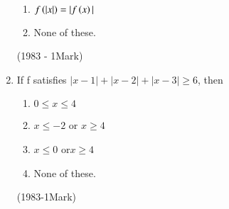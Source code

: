 \documentclass[journal]{IEEEtran}
\begin{document}
\begin{enumerate}
\begin{multicols}{2}
\begin{enumerate}
      \item $f\left(|x|\right)=|f\left(x\right)|$

      \item None of these.
      \end{enumerate}
  \end{multicols}
  \hfill
  (1983 - 1Mark)



  \item If f satisfies $|x-1| + |x-2| + |x-3|\geq6$, then
  \begin{multicols}{2}
    \begin{enumerate}
        

      \item $0\leq x\leq4$
      
      \item $x \leq-2$ or $x\geq4$
      
      \item $x\leq0$ or$x\geq4$
      
      \item None of these.

    \end{enumerate}
  \end{multicols}
  \hfill
  (1983-1Mark)



  

\end{enumerate}
\end{document}

